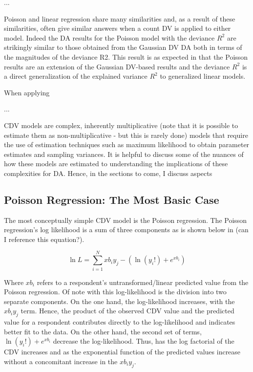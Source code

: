 \documentclass[ShortAfour,times,sageapa]{sagej}
\begin{document}
	...
	
	
	Poisson and linear regression share many similarities and, as a result of these similarities, often give similar answers when a count DV is applied to either model.
	Indeed the DA results for the Poisson model with the deviance $R^2$ are strikingly similar to those obtained from the Gaussian DV DA both in terms of the magnitudes of the deviance R2.  
	This result is as expected in that the Poisson results are an extension of the Gaussian DV-based results and the deviance $R^2$ is a direct generalization of the explained variance $R^2$ to generalized linear models.
	
	When applying
	
	...
	
	
	CDV models are complex, inherently multiplicative (note that it is possible to estimate them as non-multiplicative - but this is rarely done) models that require the use of estimation techniques such as maximum likelihood to obtain parameter estimates and sampling variances.
	It is helpful to discuss some of the nuances of how these models are estimated to understanding the implications of these complexities for DA.
	Hence, in the sections to come, I discuss aspects 

	\subsection{Poisson Regression: The Most Basic Case}
	
	The most conceptually simple CDV model is the Poisson regression.  
	The Poisson regression's log likelihood is a sum of three components as is shown below in (can I reference this equation?).
	
	\begin{equation}
		\ln L = \sum_{i=1}^{N} xb_{i}y_{j} - (\ln (y_{i}!) + e^{xb_{i}})
	\end{equation}

	Where $xb_{i}$ refers to a respondent's untransformed/linear predicted value from the Poisson regression.  
	Of note with this log-likelihood is the division into two separate components.  
	On the one hand, the log-likelihood increases, with the $xb_{i}y_{j}$ term.  
	Hence, the product of the observed CDV value and the predicted value for a respondent contributes directly to the log-likelihood and indicates better fit to the data.
	On the other hand, the second set of terms, $\ln (y_{i}!) + e^{xb_{i}}$ decrease the log-likelihood.  
	Thus, has the log factorial of the CDV increases and as the exponential function of the predicted values increase without a concomitant increase in the $xb_{i}y_{j}$.
	
\end{document}
